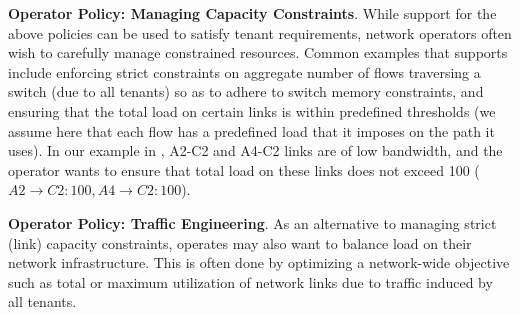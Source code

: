 \begin{compactitemize}
\item \textbf{Operator Policy: Managing Capacity Constraints}. While
  support for the above policies can be used to satisfy tenant 
  requirements, network operators often wish to
  carefully manage constrained resources. Common examples that \Name
  supports include enforcing strict constraints on aggregate number of
  flows traversing a switch (due to all tenants) so as to adhere to
  switch memory constraints, and ensuring that the total load on
  certain links is within predefined thresholds (we assume here that
  each flow has a predefined load that it imposes on the path it
  uses). In our example in , A2-C2 and A4-C2
  links are of low bandwidth, and the operator wants to ensure that
  total load on these links does not exceed 100 
  ($A2\rightarrow C2: 100, A4 \rightarrow C2:100$).

\item \textbf{Operator Policy: Traffic Engineering}. As an alternative to
  managing strict (link) capacity constraints, operates may also want
  to balance load on their network infrastructure. This is often done
  by optimizing a network-wide objective such as total or maximum
  utilization of network links due to traffic induced by all tenants.
  
  

\end{compactitemize}
